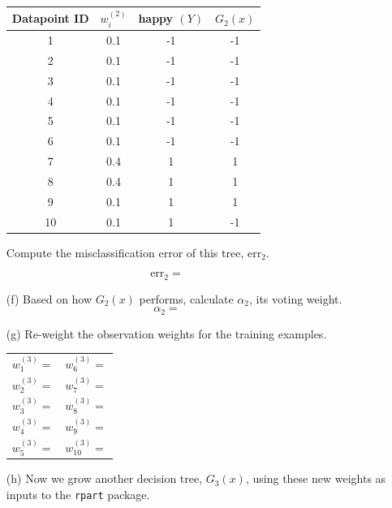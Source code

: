 \begin{enumerate}
{\small
\begin{center}
\begin{tabular}{cccc}
\toprule
Datapoint ID & $w_i^{(2)}$ & happy $(Y)$ & $G_2(x)$ \\
\midrule
1 & 0.1 & -1 & -1 \\
2 & 0.1 & -1 & -1 \\
3 & 0.1 & -1 & -1 \\
4 & 0.1 & -1 & -1 \\
5 & 0.1 & -1 & -1 \\
6 & 0.1 & -1 & -1 \\
\midrule
7 & 0.4 & 1 & 1 \\
8 & 0.4 & 1 & 1 \\
9 & 0.1 & 1 & 1 \\
10 & 0.1 & 1 & -1 \\
\bottomrule
\end{tabular}
\end{center}
}

\noindent Compute the misclassification error of this tree, $\text{err}_2$. 

$$ \text{err}_2 = \qquad \qquad \qquad $$
\vspace{3mm}

\item[(f)] Based on how $G_2(x)$ performs, calculate $\alpha_2$, its voting weight.
$$ \alpha_2 = \qquad \qquad \qquad $$

\item[(g)] Re-weight the observation weights for the training examples.
\begin{center}
\begin{tabular}{p{}p{}}
$w_1^{(3)} = $ \hfill & $w_6^{(3)} = $ \hfill \\
$w_2^{(3)} = $ \hfill & $w_7^{(3)} = $ \hfill \\
$w_3^{(3)} = $ \hfill & $w_8^{(3)} = $ \hfill \\
$w_4^{(3)} = $ \hfill & $w_9^{(3)} = $ \hfill \\
$w_5^{(3)} = $ \hfill & $w_{10}^{(3)} = $ \hfill \\
\end{tabular}
\end{center}

\item[(h)] Now we grow another decision tree, $G_3(x)$, using these new weights as inputs to the \texttt{rpart} package. 


\end{enumerate}
